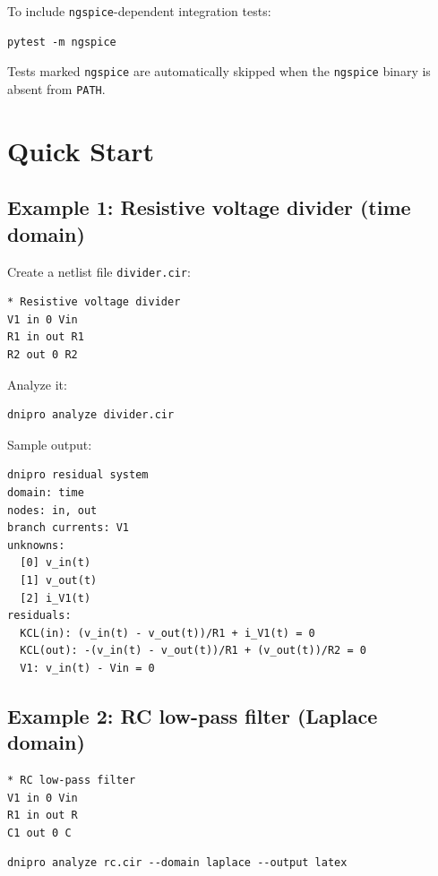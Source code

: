 \documentclass[11pt,a4paper]{article}
\newcommand{\code}[1]{\texttt{#1}}
\newcommand{\ngspice}{\texttt{ngspice}}
\begin{document}
To include \ngspice{}-dependent integration tests:

\begin{lstlisting}[style=shell]
pytest -m ngspice
\end{lstlisting}

Tests marked \code{ngspice} are automatically skipped when the \ngspice{} binary
is absent from \code{PATH}.

\section{Quick Start}
\label{sec:quickstart}

\subsection{Example 1: Resistive voltage divider (time domain)}

Create a netlist file \code{divider.cir}:

\begin{lstlisting}[language=spice]
* Resistive voltage divider
V1 in 0 Vin
R1 in out R1
R2 out 0 R2
\end{lstlisting}

Analyze it:

\begin{lstlisting}[style=shell]
dnipro analyze divider.cir
\end{lstlisting}

Sample output:

\begin{lstlisting}
dnipro residual system
domain: time
nodes: in, out
branch currents: V1
unknowns:
  [0] v_in(t)
  [1] v_out(t)
  [2] i_V1(t)
residuals:
  KCL(in): (v_in(t) - v_out(t))/R1 + i_V1(t) = 0
  KCL(out): -(v_in(t) - v_out(t))/R1 + (v_out(t))/R2 = 0
  V1: v_in(t) - Vin = 0
\end{lstlisting}

\subsection{Example 2: RC low-pass filter (Laplace domain)}

\begin{lstlisting}[language=spice]
* RC low-pass filter
V1 in 0 Vin
R1 in out R
C1 out 0 C
\end{lstlisting}

\begin{lstlisting}[style=shell]
dnipro analyze rc.cir --domain laplace --output latex
\end{lstlisting}
\end{document}
